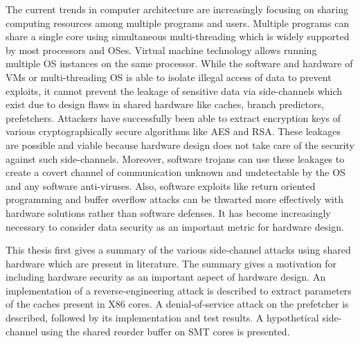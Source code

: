 \begin{Abstract}

    The current trends in computer architecture are increasingly focusing on
    sharing computing resources among multiple programs and users.
    Multiple programs can share a single core using simultaneous multi-threading
    which is widely supported by most processors and OSes.
    Virtual machine technology allows running multiple OS instances on the same
    processor. While the software and hardware of VMs or multi-threading OS
    is able to isolate illegal access of data to prevent exploits, 
    it cannot prevent the leakage of sensitive data via side-channels
    which exist due to design flaws in shared hardware like caches, branch predictors,
    prefetchers.
    Attackers have successfully been able to extract encryption keys of
    various cryptographically secure algorithms like AES and RSA.
    These leakages are possible and viable because hardware design
    does not take care of the security against such side-channels.
    Moreover, software trojans can use these leakages to create a
    covert channel of communication unknown and undetectable by the OS
    and any software anti-viruses.
    Also, software exploits like return oriented programming
    and buffer overflow attacks can be thwarted more effectively
    with hardware solutions rather than software defenses.
    It has become increasingly necessary to consider data security as
    an important metric for hardware design.

    This thesis first gives a summary of the various side-channel
    attacks using shared hardware which are present in literature.
    The summary gives a motivation for including hardware security as
    an important aspect of hardware design.
    An implementation of a reverse-engineering attack is described
    to extract parameters of the caches present in X86 cores.
    A denial-of-service attack on the prefetcher is described, followed
    by its implementation and test results. A hypothetical side-channel
    using the shared reorder buffer on SMT cores is presented.
%
%
%
%
%
\end{Abstract}

